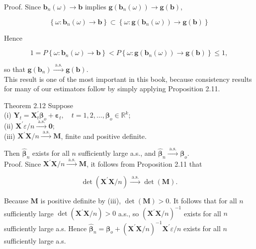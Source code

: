 \documentclass[10pt]{article}
\begin{document}
Proof. Since $\mathbf{b}_{n}(\omega) \rightarrow \mathbf{b}$ implies $\mathbf{g}\left(\mathbf{b}_{n}(\omega)\right) \rightarrow \mathbf{g}(\mathbf{b})$,

$$
\left\{\omega: \mathbf{b}_{n}(\omega) \rightarrow \mathbf{b}\right\} \subset\left\{\omega: \mathbf{g}\left(\mathbf{b}_{n}(\omega)\right) \rightarrow \mathbf{g}(\mathbf{b})\right\}
$$

Hence

$$
1=P\left\{\omega: \mathbf{b}_{n}(\omega) \rightarrow \mathbf{b}\right\}<P\left\{\omega: \mathbf{g}\left(\mathbf{b}_{n}(\omega)\right) \rightarrow \mathbf{g}(\mathbf{b})\right\} \leq 1,
$$

so that $\mathbf{g}\left(\mathbf{b}_{n}\right) \xrightarrow{\text { a.s. }} \mathbf{g}(\mathbf{b})$.\\
This result is one of the most important in this book, because consistency results for many of our estimators follow by simply applying Proposition 2.11.

Theorem 2.12 Suppose\\
(i) $\mathbf{Y}_{t}=\mathbf{X}_{t}^{\prime} \boldsymbol{\beta}_{o}+\boldsymbol{\varepsilon}_{t}, \quad t=1,2, \ldots, \boldsymbol{\beta}_{o} \in \mathbb{R}^{k}$;\\
(ii) $\mathbf{X}^{\prime} \varepsilon / n \xrightarrow{\text { a.s. }} \mathbf{0}$;\\
(iii) $\mathbf{X}^{\prime} \mathbf{X} / n \xrightarrow{\text { a.s. }} \mathbf{M}$, finite and positive definite.

Then $\hat{\boldsymbol{\beta}}_{n}$ exists for all $n$ sufficiently large a.s., and $\hat{\boldsymbol{\beta}}_{n} \xrightarrow{\text { a.s. }} \boldsymbol{\beta}_{o}$.\\
Proof. Since $\mathbf{X}^{\prime} \mathbf{X} / n \xrightarrow{\text { a.s. }} \mathbf{M}$, it follows from Proposition 2.11 that

$$
\operatorname{det}\left(\mathbf{X}^{\prime} \mathbf{X} / n\right) \xrightarrow{\text { a.s. }} \operatorname{det}(\mathbf{M}) .
$$

Because $\mathbf{M}$ is positive definite by (iii), $\operatorname{det}(\mathbf{M})>0$. It follows that for all $n$ sufficiently large $\operatorname{det}\left(\mathbf{X}^{\prime} \mathbf{X} / n\right)>0$ a.s., so $\left(\mathbf{X}^{\prime} \mathbf{X} / n\right)^{-1}$ exists for all $n$ sufficiently large a.s. Hence $\hat{\boldsymbol{\beta}}_{n}=\boldsymbol{\beta}_{o}+\left(\mathbf{X}^{\prime} \mathbf{X} / n\right)^{-1} \mathbf{X}^{\prime} \varepsilon / n$ exists for all $n$ sufficiently large a.s.
\end{document}
